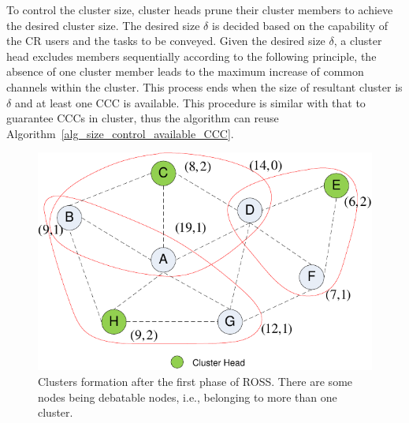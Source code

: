 \documentclass[10pt,journal,compsoc]{IEEEtran}
\theoremstyle{mytheoremstyle}
\theoremstyle{mytheoremstyle}
\theoremstyle{mytheoremstyle}
\newcommand{\ie}{i.e., }
\begin{document}
To control the cluster size, cluster heads prune their cluster members to achieve the desired cluster size.
The desired size $\delta$ is decided based on the capability of the CR users and the tasks to be conveyed.
Given the desired size $\delta$, a cluster head excludes members sequentially according to the following principle, the absence of one cluster member leads to the maximum increase of common channels within the cluster.
This process ends when the size of resultant cluster is $\delta$ and at least one CCC is available.
This procedure is similar with that to guarantee CCCs in cluster, thus the algorithm can reuse Algorithm~\ref{alg_size_control_available_CCC}.








\begin{figure}[ht!]
  \centering
  \includegraphics[width=0.6\linewidth]{figure2.pdf}
  \caption{Clusters formation after the first phase of ROSS. There are some nodes being debatable nodes, \ie belonging to more than one cluster.}
  \label{fig2}
\end{figure}
\end{document}
